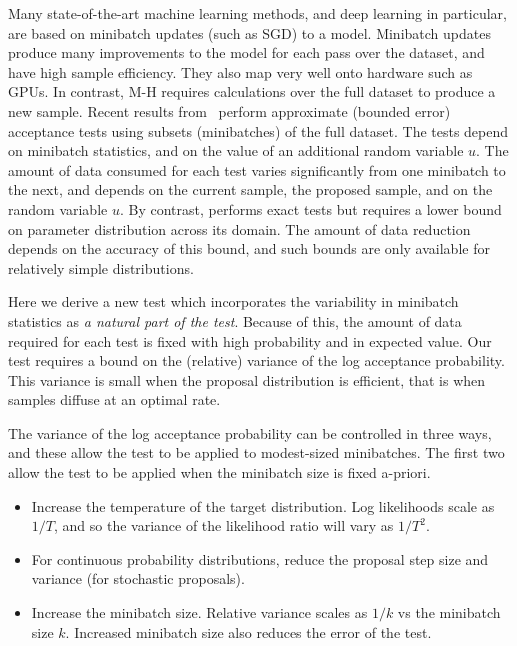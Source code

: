\documentclass{article}
\begin{document}
Many state-of-the-art machine learning methods, and deep learning in
particular, are based on minibatch updates (such as SGD) to a model.
Minibatch updates produce many improvements to the model for each pass
over the dataset, and have high sample efficiency. They also
map very well onto hardware such as GPUs. In contrast, M-H requires
calculations over the full dataset to produce a new sample.  Recent
results from~\cite{cutting_mh_2014,icml2014c1_bardenet14} perform
approximate (bounded error) acceptance tests using subsets
(minibatches) of the full dataset. The tests depend on minibatch
statistics, and on the value of an additional random variable $u$. The
amount of data consumed for each test varies significantly from one
minibatch to the next, and depends on the current sample, the proposed
sample, and on the random variable $u$. By contrast,
\cite{conf/uai/MaclaurinA14} performs exact tests but requires a lower
bound on parameter distribution across its domain. The amount of data
reduction depends on the accuracy of this bound, and such bounds are
only available for relatively simple distributions.

Here we derive a new test which incorporates the variability in
minibatch statistics as {\em a natural part of the test}. Because of
this, the amount of data required for each test is fixed with high
probability and in expected value. Our test requires a bound on the
(relative) variance of the log acceptance probability. This variance
is small when the proposal distribution is efficient, that is when samples
diffuse at an optimal rate.

The variance of the log acceptance probability can be controlled in
three ways, and these allow the test to be applied to modest-sized
minibatches. The first two allow the test to be applied when the
minibatch size is fixed a-priori.

\begin{itemize}
  
\item Increase the temperature of the target distribution. Log likelihoods
  scale as $1/T$, and so the variance of the likelihood ratio will
  vary as $1/T^2$.

\item For continuous probability distributions, reduce the proposal
  step size and variance (for stochastic proposals). 

\item Increase the minibatch size. Relative variance scales as $1/k$ vs the
  minibatch size $k$. Increased minibatch size also reduces the error of
  the test. 

\end{itemize}
\end{document}
